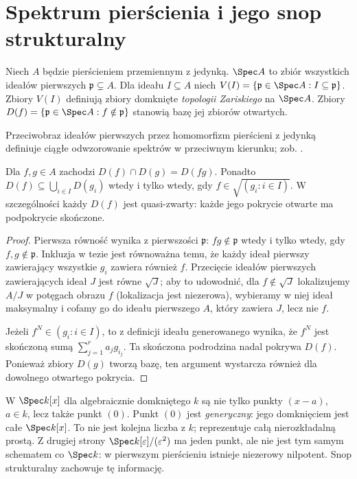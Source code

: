 \section{Spektrum pierścienia i jego snop strukturalny}
\label{sec:spek-snop}

\begin{definicja}[Spektrum]\label{ga:def:prime-spectrum}
Niech $A$ będzie pierścieniem przemiennym z jedynką.
$\Spec A$ to zbiór wszystkich ideałów pierwszych
$\mathfrak p\subsetneq A$. Dla ideału $I\subseteq A$
niech $V(I)=\{\mathfrak p\in\Spec A:I\subseteq\mathfrak p\}$.
Zbiory $V(I)$ definiują zbiory domknięte
\emph{topologii Zariskiego} na $\Spec A$.
Zbiory $D(f)=\{\mathfrak p\in\Spec A:f\notin\mathfrak p\}$
stanowią bazę jej zbiorów otwartych.
\end{definicja}

Przeciwobraz ideałów pierwszych przez homomorfizm pierścieni z jedynką definiuje ciągłe odwzorowanie spektrów w przeciwnym kierunku; zob. .

\begin{stwierdzenie}
Dla $f,g\in A$ zachodzi
$D(f)\cap D(g)=D(fg)$. Ponadto
$D(f)\subseteq\bigcup_{i\in I}D(g_i)$ wtedy
i tylko wtedy, gdy $f\in\sqrt{(g_i:i\in I)}$.
W szczególności każdy $D(f)$ jest quasi-zwarty:
każde jego pokrycie otwarte ma podpokrycie skończone.
\end{stwierdzenie}
\begin{proof}
Pierwsza równość wynika z pierwszości
$\mathfrak p$: $fg\notin\mathfrak p$ wtedy
i tylko wtedy, gdy $f,g\notin\mathfrak p$.
Inkluzja w tezie jest równoważna temu, że
każdy ideał pierwszy zawierający wszystkie $g_i$
zawiera również $f$. Przecięcie ideałów pierwszych
zawierających ideał $J$ jest równe $\sqrt J$;
aby to udowodnić, dla $f\notin\sqrt J$ lokalizujemy
$A/J$ w potęgach obrazu $f$ (lokalizacja jest
niezerowa), wybieramy w niej ideał maksymalny
i cofamy go do ideału pierwszego $A$,
który zawiera $J$, lecz nie $f$.

Jeżeli $f^N\in(g_i:i\in I)$, to z definicji
ideału generowanego wynika, że $f^N$ jest
skończoną sumą $\sum_{j=1}^r a_j g_{i_j}$.
Ta skończona podrodzina nadal pokrywa $D(f)$.
Ponieważ zbiory $D(g)$ tworzą bazę, ten argument
wystarcza również dla dowolnego otwartego pokrycia.
\end{proof}

\begin{uwaga}
W $\Spec k[x]$ dla algebraicznie domkniętego $k$
są nie tylko punkty $(x-a)$, $a\in k$, lecz także
punkt $(0)$. Punkt $(0)$ jest \emph{generyczny}:
jego domknięciem jest całe $\Spec k[x]$.
To nie jest kolejna liczba z $k$; reprezentuje
całą nierozkładalną prostą. Z drugiej strony
$\Spec k[\varepsilon]/(\varepsilon^2)$ ma jeden
punkt, ale nie jest tym samym schematem co $\Spec k$:
w pierwszym pierścieniu istnieje niezerowy nilpotent.
Snop strukturalny zachowuje tę informację.
\end{uwaga}

